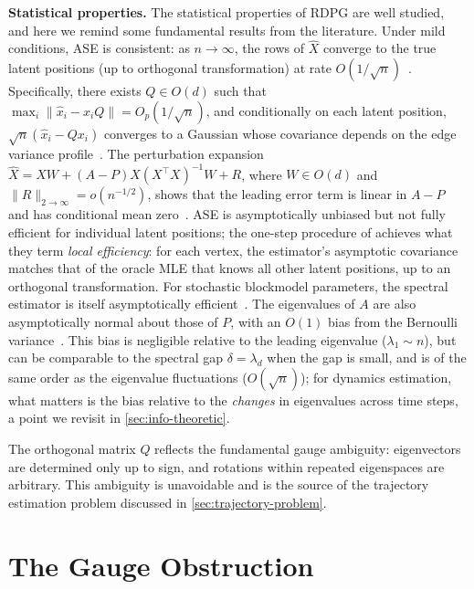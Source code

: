 \documentclass{article}
\theoremstyle{plain}
\theoremstyle{definition}
\theoremstyle{remark}
\begin{document}
\textbf{Statistical properties.}
The statistical properties of RDPG are well studied, and here we remind some fundamental results from the literature. Under mild conditions, ASE is consistent: as $n \to \infty$, the rows of $\hat{X}$ converge to the true latent positions (up to orthogonal transformation) at rate $O(1/\sqrt{n})$~\citep{athreya2016limit,athreya2017statistical}.
Specifically, there exists $Q \in O(d)$ such that $\max_i \|\hat{x}_i - x_i Q\| = O_p(1/\sqrt{n})$, and conditionally on each latent position, $\sqrt{n}(\hat{x}_i - Qx_i)$ converges to a Gaussian whose covariance depends on the edge variance profile~\citep{athreya2016limit,rubindelanchy2022statistical}.
The perturbation expansion $\hat{X} = XW + (A - P)X(X^\top X)^{-1}W + R$, where $W \in O(d)$ and $\|R\|_{2 \to \infty} = o(n^{-1/2})$, shows that the leading error term is linear in $A - P$ and has conditional mean zero~\citep{cape2019two}.
ASE is asymptotically unbiased but not fully efficient for individual latent positions; the one-step procedure of \citet{xie2021efficient} achieves what they term \emph{local efficiency}: for each vertex, the estimator's asymptotic covariance matches that of the oracle MLE that knows all other latent positions, up to an orthogonal transformation.
For stochastic blockmodel parameters, the spectral estimator is itself asymptotically efficient~\citep{tang2022efficient}.
The eigenvalues of $A$ are also asymptotically normal about those of $P$, with an $O(1)$ bias from the Bernoulli variance~\citep{tang2018eigenvalues}.
This bias is negligible relative to the leading eigenvalue ($\lambda_1 \sim n$), but can be comparable to the spectral gap $\delta = \lambda_d$ when the gap is small, and is of the same order as the eigenvalue fluctuations ($O(\sqrt{n})$); for dynamics estimation, what matters is the bias relative to the \emph{changes} in eigenvalues across time steps, a point we revisit in \cref{sec:info-theoretic}.

The orthogonal matrix $Q$ reflects the fundamental gauge ambiguity: eigenvectors are determined only up to sign, and rotations within repeated eigenspaces are arbitrary.
This ambiguity is unavoidable and is the source of the trajectory estimation problem discussed in \cref{sec:trajectory-problem}.



\section{The Gauge Obstruction}\label{sec:obstructions}
\end{document}
